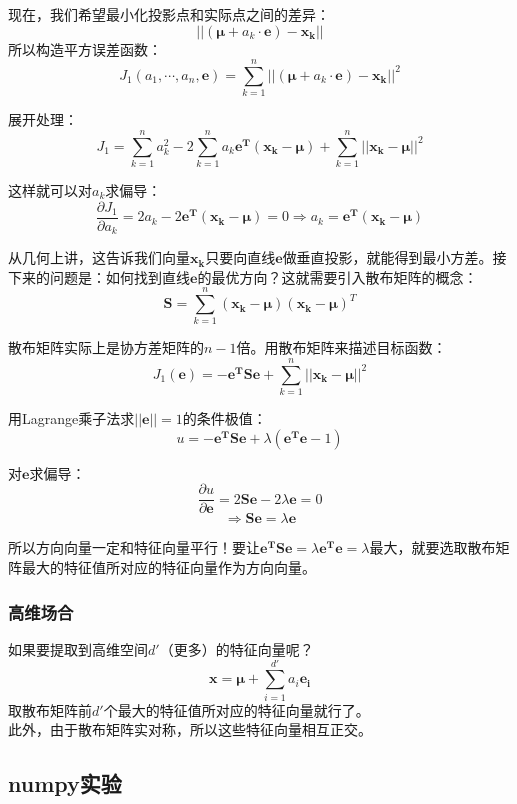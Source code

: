 \documentclass[12pt]{article}
\begin{document}
现在，我们希望最小化投影点和实际点之间的差异：\\
\[ ||(\mathbf{\mu} + a_k \cdot \mathbf{e}) - \mathbf{x_k}|| \]
所以构造平方误差函数：\\
\[ J_1(a_1, \cdots, a_n, \mathbf{e}) = \sum_{k=1}^n ||(\mathbf{\mu} + a_k \cdot \mathbf{e}) - \mathbf{x_k}||^2  \]

展开处理：\\
\[ J_1 = \sum_{k=1}^n a_k^2 - 2\sum_{k=1}^n a_k \mathbf{e^T}(\mathbf{x_k - \mu}) + \sum_{k=1}^n ||\mathbf{x_k - \mu}||^2 \]

这样就可以对$a_k$求偏导：\\
\[ \frac{\partial J_1}{\partial a_k} = 2a_k - 2\mathbf{e^T}(\mathbf{x_k - \mu}) = 0 \Rightarrow a_k = \mathbf{e^T}(\mathbf{x_k - \mu}) \]

从几何上讲，这告诉我们向量$\mathbf{x_k}$只要向直线$\mathbf{e}$做垂直投影，就能得到最小方差。接下来的问题是：如何找到直线$\mathbf{e}$的最优方向？这就需要引入散布矩阵的概念：\\
\[ \mathbf{S} = \sum_{k=1}^n (\mathbf{x_k - \mu})(\mathbf{x_k - \mu})^T \]

散布矩阵实际上是协方差矩阵的$n-1$倍。用散布矩阵来描述目标函数：\\
\[ J_1(\mathbf{e}) = -\mathbf{e^TSe} + \sum_{k=1}^n ||\mathbf{x_k - \mu}||^2 \]

用Lagrange乘子法求$||\mathbf{e}||=1$的条件极值：\\
\[ u = -\mathbf{e^TSe} + \lambda \left( \mathbf{e^Te} - 1 \right) \]

对$\mathbf{e}$求偏导：\\
\[ \frac{\partial u}{\partial \mathbf{e}} = 2\mathbf{Se} - 2\lambda\mathbf{e} = 0 \]
\[ \Rightarrow  \mathbf{Se} = \lambda\mathbf{e} \]

所以方向向量一定和特征向量平行！要让$\mathbf{e^TSe} = \lambda\mathbf{e^Te} = \lambda$最大，就要选取散布矩阵最大的特征值所对应的特征向量作为方向向量。

\subsubsection{高维场合}
如果要提取到高维空间$d'$（更多）的特征向量呢？
\[ \mathbf{x = \mu} + \sum_{i=1}^{d'} a_i \mathbf{e_i} \]
取散布矩阵前$d'$个最大的特征值所对应的特征向量就行了。\\

此外，由于散布矩阵实对称，所以这些特征向量相互正交。

\subsection{numpy实验}
\end{document}
